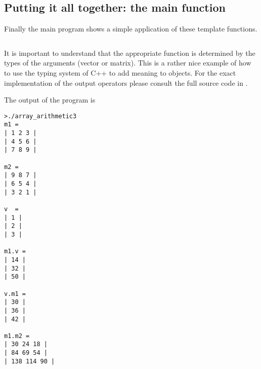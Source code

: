 \subsection{Putting it all together: the main function}
Finally the main program shows a simple application of these template functions. 
\inputminted[fontsize=\small,
             linenos,
             firstline=116,
             lastline=138,
             firstnumber=116,
             frame=lines,
             label=examples/array\_arithemtic3.cpp]
{cpp}{../examples/array_arithmetic3.cpp}
It is important to understand that the appropriate function is determined by the
types of the arguments (vector or matrix). This is a rather nice example of how
to use the typing system of C++ to add meaning to objects. For the exact
implementation of the output operators please consult the full source code in 
.

The output of the program is
\begin{verbatim}
>./array_arithmetic3
m1 = 
| 1 2 3 |
| 4 5 6 |
| 7 8 9 |

m2 = 
| 9 8 7 |
| 6 5 4 |
| 3 2 1 |

v  = 
| 1 |
| 2 |
| 3 |

m1.v = 
| 14 |
| 32 |
| 50 |

v.m1 = 
| 30 |
| 36 |
| 42 |

m1.m2 = 
| 30 24 18 |
| 84 69 54 |
| 138 114 90 |
\end{verbatim}
